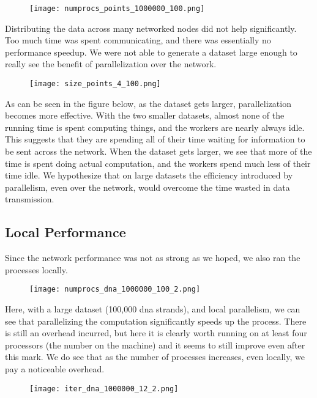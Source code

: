 \documentclass[12pt]{article}
\begin{document}
\begin{figure}[H]
\centering
\texttt{[image: numprocs\_points\_1000000\_100.png]}
\end{figure}

Distributing the data across many networked nodes did not help significantly. Too much time was spent communicating, and there was essentially no performance speedup. We were not able to generate a dataset large enough to really see the benefit of parallelization over the network.


\begin{figure}[H]
\centering
\texttt{[image: size\_points\_4\_100.png]}
\end{figure}

As can be seen in the figure below, as the dataset gets larger, parallelization becomes more effective. With the two smaller datasets, almost none of the running time is spent computing things, and the workers are nearly always idle. This suggests that they are spending all of their time waiting for information to be sent across the network. When the dataset gets larger, we see that more of the time is spent doing actual computation, and the workers spend much less of their time idle. We hypothesize that on large datasets the efficiency introduced by parallelism, even over the network, would overcome the time wasted in data transmission.


\subsection{Local Performance}

Since the network performance was not as strong as we hoped, we also ran the processes locally.

\begin{figure}[H]
\centering
\texttt{[image: numprocs\_dna\_1000000\_100\_2.png]}
\end{figure}

Here, with a large dataset (100,000 dna strands), and local parallelism, we can see that parallelizing the computation significantly speeds up the process. There is still an overhead incurred, but here it is clearly worth running on at least four processors (the number on the machine) and it seems to still improve even after this mark. We do see that as the number of processes increases, even locally, we pay a noticeable overhead.

\begin{figure}[H]
\centering
\texttt{[image: iter\_dna\_1000000\_12\_2.png]}
\end{figure}
\end{document}

